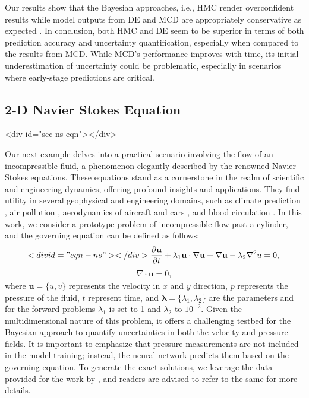 \documentclass{article}
\begin{document}
Our results show that the Bayesian approaches, i.e., HMC render overconfident results while model outputs from DE and MCD are appropriately conservative as expected \citep{basu2022uncertainty}.
In conclusion, both HMC and DE seem to be superior in terms of both prediction accuracy and uncertainty quantification, especially when compared to the results from MCD. 
While MCD's performance improves with time, its initial underestimation of uncertainty could be problematic, especially in scenarios where early-stage predictions are critical.

\subsection{2-D Navier Stokes Equation}<div id="sec-ns-eqn"></div>

Our next example delves into a practical scenario involving the flow of an incompressible fluid, a phenomenon elegantly described by the renowned Navier-Stokes equations. 
These equations stand as a cornerstone in the realm of scientific and engineering dynamics, offering profound insights and applications. 
They find utility in several geophysical and engineering domains, such as climate prediction \citep{palmer2019stochastic}, air pollution \citep{adair2015reynolds}, aerodynamics of aircraft and cars \citep{hassan2014numerical, liu2016navier, vos2002navier}, and blood circulation \citep{thomas2016blood, AlbertoS}. 
In this work, we consider a prototype problem of incompressible flow past a cylinder, and the governing equation can be defined as follows:
\begin{equation}<div id="eqn-ns"></div>

\frac{\partial \mathbf{u}}{\partial t} + \lambda_1 \mathbf{u} \cdot \nabla \mathbf{u} + \nabla \mathbf{u} - \lambda_2 \nabla^2 u = 0, \\
\end{equation}
\begin{gather*}
\nabla \cdot \mathbf{u} = 0,
\end{gather*}
where $\mathbf{u}=\{u,v\}$ represents the velocity in $x$ and $y$ direction, $p$ represents the pressure of the fluid, $t$ represent time, and $\mathbf{\lambda}=\{\lambda_1, \lambda_2\}$ are the parameters and for the forward problems $\lambda_1$ is set to 1 and $\lambda_2$ to $10^{-2}$.
Given the multidimensional nature of this problem, it offers a challenging testbed for the Bayesian approach to quantify uncertainties in both the velocity and pressure fields.
It is important to emphasize that pressure measurements are not included in the model training; instead, the neural network predicts them based on the governing equation. To generate the exact solutions, we leverage the data provided for the work by \citep{raissi2019physics}, and readers are advised to refer to the same for more details.
\end{document}
